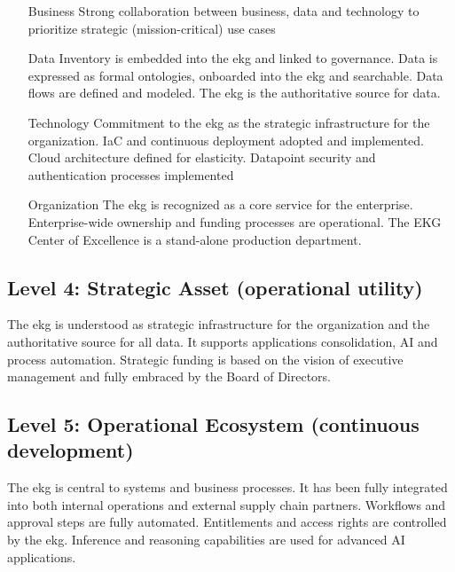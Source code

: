 \begin{itemize}[leftmargin=1in,font=\bfseries]

    \item[Business]     Strong collaboration between business, data and technology to prioritize strategic
                        (mission-critical) use cases
    \item[Data]         Inventory is embedded into the \gls{ekg} and linked to governance.
                        Data is expressed as formal ontologies, onboarded into the \gls{ekg} and searchable.
                        Data flows are defined and modeled.
                        The \gls{ekg} is the authoritative source for data.
    \item[Technology]   Commitment to the \gls{ekg} as the strategic infrastructure for the organization.
                        IaC and continuous deployment adopted and implemented.
                        Cloud architecture defined for elasticity.
                        Datapoint security and authentication processes implemented
    \item[Organization] The \gls{ekg} is recognized as a core service for the enterprise.
                        Enterprise-wide ownership and funding processes are operational.
                        The EKG Center of Excellence is a stand-alone production department.

\end{itemize}

\subsection{Level 4: Strategic Asset (operational utility)}

The \gls{ekg} is understood as strategic infrastructure for the organization and the authoritative source
for all data.
It supports applications consolidation, AI and process automation.
Strategic funding is based on the vision of executive management and fully embraced by the Board of Directors.

\subsection{Level 5: Operational Ecosystem (continuous development)}

The \gls{ekg} is central to systems and business processes.
It has been fully integrated into both internal operations and external supply chain partners.
Workflows and approval steps are fully automated.
Entitlements and access rights are controlled by the \gls{ekg}.
Inference and reasoning capabilities are used for advanced AI applications.
